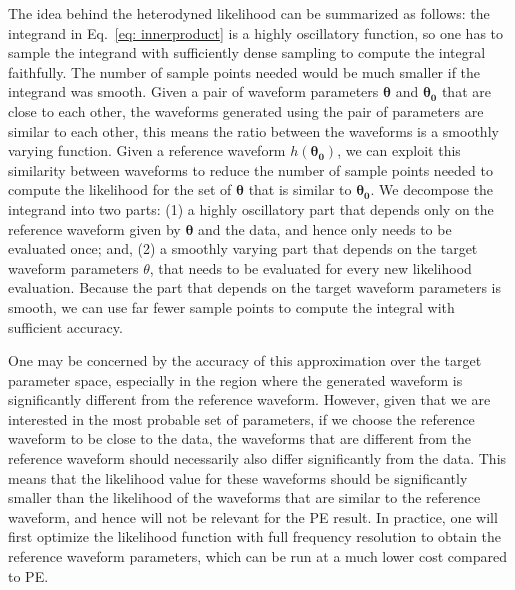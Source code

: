 \documentclass[twocolumn]{aastex631}
\begin{document}
The idea behind the heterodyned likelihood can be summarized as follows: the
integrand in Eq.~\eqref{eq: innerproduct} is a highly oscillatory function, so
one has to sample the integrand with sufficiently dense sampling to compute the
integral faithfully. The number of sample points needed would be much smaller
if the integrand was smooth. Given a pair of waveform parameters
$\mathbf{\theta}$ and $\mathbf{\theta_0}$ that are close to each other, the
waveforms generated using the pair of parameters are similar to each other,
this means the ratio between the waveforms is a smoothly varying function.
Given a reference waveform $h(\mathbf{\theta_0})$, we can exploit this
similarity between waveforms to reduce the number of sample points needed to
compute the likelihood for the set of $\mathbf{\theta}$ that is similar to
$\mathbf{\theta_0}$. We decompose the integrand into two parts: (1) a highly
oscillatory part that depends only on the reference waveform given by
$\mathbf{\theta}$ and the data, and hence only needs to be evaluated once; and,
(2) a smoothly varying part that depends on the target waveform parameters
$\theta$, that needs to be evaluated for every new likelihood evaluation.
Because the part that depends on the target waveform parameters is smooth, we
can use far fewer sample points to compute the integral with sufficient
accuracy.

One may be concerned by the accuracy of this approximation over the target
parameter space, especially in the region where the generated waveform is
significantly different from the reference waveform. However, given that we are
interested in the most probable set of parameters, if we choose the reference
waveform to be close to the data, the waveforms that are different from the
reference waveform should necessarily also differ significantly from the data.
This means that the likelihood value for these waveforms should be
significantly smaller than the likelihood of the waveforms that are similar to
the reference waveform, and hence will not be relevant for the PE result. In
practice, one will first optimize the likelihood function with full frequency
resolution to obtain the reference waveform parameters, which can be run at a
much lower cost compared to PE. 
\end{document}
